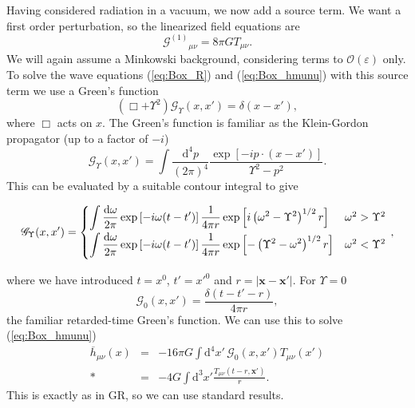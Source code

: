 \documentclass[aps,prd,amsfonts,amssymb,amsmath,nofootinbib,reprint,showpacs]{revtex4-1}
\newcommand{\eqnref}[1]{(\ref{eq:#1})}
\newcommand{\dd}{\ensuremath{\text{d}}}
\newcommand{\recip}[1]{\ensuremath{\frac{1}{#1}}}
\newcommand{\order}[1]{\ensuremath{\mathcal{O}({#1})}}
\begin{document}
Having considered radiation in a vacuum, we now add a source term. We want a first order perturbation, so the linearized field equations are
\begin{equation}
 {\mathcal{G}^{(1)}}_{\mu\nu} = 8\pi G T_{\mu\nu}.
\end{equation}
We will again assume a Minkowski background, considering terms to $\order{\varepsilon}$ only. To solve the wave equations \eqnref{Box_R} and \eqnref{Box_hmunu} with this source term we use a Green's function
\begin{equation}
\left(\Box + \Upsilon^2\right)\mathscr{G}_\Upsilon(x, x') = \delta(x - x'),
\end{equation}
where $\Box$ acts on $x$. The Green's function is familiar as the Klein-Gordon propagator (up to a factor of $-i$)~\cite{Peskin1995a}
\begin{equation}
\mathscr{G}_\Upsilon(x, x') = \int \frac{\dd^4 p}{(2\pi)^4} \frac{\exp\left[-ip\cdot(x-x')\right]}{\Upsilon^2 - p^2}.
\end{equation}
This can be evaluated by a suitable contour integral to give
\begin{widetext}
\begin{equation}
\mathscr{G}_\Upsilon(x, x') =
\begin{cases}
{\displaystyle \int{\frac{\dd \omega}{2\pi} \exp\left[-i\omega(t-t')\right]\recip{4\pi r}\exp\left[i\left(\omega^2 - \Upsilon^2\right)^{1/2}r\right]}} & \omega^2 > \Upsilon^2\vspace{0.8mm}\\
{\displaystyle \int{\frac{\dd \omega}{2\pi} \exp\left[-i\omega(t-t')\right]\recip{4\pi r}\exp\left[-\left(\Upsilon^2 - \omega^2\right)^{1/2}r\right]}} & \omega^2 < \Upsilon^2\vspace{0.8mm}
\end{cases}\, ,
\label{eq:Green}
\end{equation}
\end{widetext}
where we have introduced $t = x^0$, $t' = x'^0$ and $r = |\boldsymbol{x} - \boldsymbol{x'}|$. For $\Upsilon = 0$
\begin{equation}
\mathscr{G}_0(x, x') = \frac{\delta(t - t' - r)}{4 \pi r},
\end{equation}
the familiar retarded-time Green's function. We can use this to solve \eqnref{Box_hmunu}
\begin{eqnarray}
\overline{h}_{\mu\nu}(x) & = & -16 \pi G \int \dd^4 x'\, \mathscr{G}_0(x, x') T_{\mu\nu}(x') \nonumber \\*
 & = & -4 G \int \dd^3 x' \frac{T_{\mu\nu}(t - r, \boldsymbol{x'})}{r}.
\end{eqnarray}
This is exactly as in GR, so we can use standard results.
\end{document}
